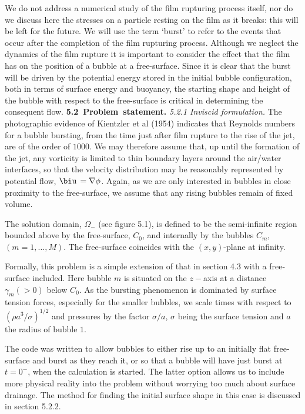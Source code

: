 We do not address a numerical study
of the film rupturing process itself, nor do we discuss here
the stresses on a particle resting on the film as it breaks:
this will be left for the future. 
We will use the term `burst' to refer to the events that occur
after the completion of the film rupturing process.
Although we neglect the dynamics of the film rupture it is 
important to consider the effect that the film has on the position of
a bubble at a free-surface.
Since it is clear that the burst will be driven by the potential energy
stored in the initial bubble configuration, both in terms of
surface energy and buoyancy,
the starting shape and height of the bubble with respect to the free-surface
is critical in determining the consequent flow.
\vskip 15pt
\hbox{\bf 5.2 Problem statement.}
\vskip 15pt
\c{\it 5.2.1 Inviscid formulation.}
\vskip 5pt
The photographic evidence of Kientzler et al (1954) indicates that
Reynolds numbers for a bubble bursting, 
from the time just after film rupture to the 
rise of the jet, are of the order of $1000$.
We may therefore assume that, up until the formation of the jet,
any vorticity is limited to thin boundary
layers around the air/water interfaces, so that the velocity
distribution may be reasonably represented by
potential flow, $\bd{u}=\nabla\phi$.
Again, as we are only interested in bubbles in close
proximity to the free-surface, we assume that any rising bubbles
remain of fixed volume.

The solution domain, $\Omega_-$
(see figure 5.1), is defined to be the 
semi-infinite region bounded above by the free-surface, $C_0$, and
internally by the bubbles \hbox{$C_m$, $(m=1,\ldots,M)$}.
The free-surface coincides with the $(x,y)$-plane at infinity. 

Formally, this problem is a simple extension of that in section 4.3
with a free-surface included.
Here bubble $m$ is situated on the $z-$axis at a distance 
$\gamma_m(>0)$ below $C_0$.
As the bursting phenomenon is dominated by surface tension forces,
especially for the smaller bubbles, we scale times with respect to 
$(\rho a^3/\sigma)^{1/2}$
and pressures by the factor $\sigma/a$, $\sigma$ being the surface tension
and $a$ the radius of bubble $1$.

The code was written to allow bubbles to either rise up to an
initially flat free-surface and burst as they reach it,
or so that a bubble will have just burst
at $t=0^-$, when the calculation is started. The latter option
allows us to include more physical reality into the problem 
without worrying too much about surface drainage. The method
for finding the initial surface shape in this case is discussed in section 5.2.2.

